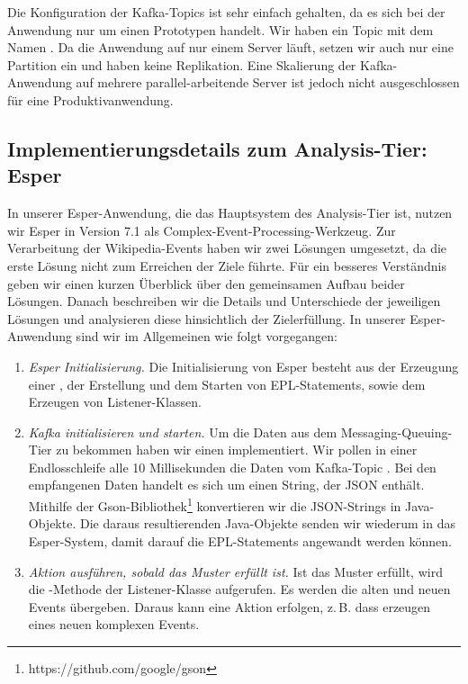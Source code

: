 Die Konfiguration der Kafka-Topics ist sehr einfach gehalten, da es sich bei der Anwendung nur um einen Prototypen handelt.
Wir haben ein Topic mit dem Namen . Da die Anwendung auf nur einem Server läuft, setzen wir auch nur
eine Partition ein und haben keine Replikation. Eine Skalierung der Kafka-Anwendung auf mehrere
parallel-arbeitende Server ist jedoch nicht ausgeschlossen für eine Produktivanwendung.

\subsection{Implementierungsdetails zum Analysis-Tier: Esper}
In unserer Esper-Anwendung, die das Hauptsystem des Analysis-Tier ist, nutzen wir Esper in Version 7.1
als Complex-Event-Processing-Werkzeug.
Zur Verarbeitung der Wikipedia-Events haben wir zwei Lösungen umgesetzt, da die erste Lösung nicht
zum Erreichen der Ziele führte. Für ein besseres Verständnis geben wir einen kurzen Überblick über den gemeinsamen Aufbau beider
Lösungen. Danach beschreiben wir die Details und Unterschiede der jeweiligen Lösungen und analysieren diese hinsichtlich der
Zielerfüllung.
In unserer Esper-Anwendung sind wir im Allgemeinen wie folgt vorgegangen:

\begin{enumerate}
    \item \textit{Esper Initialisierung.} Die Initialisierung von Esper besteht aus der Erzeugung einer ,
    der Erstellung und dem Starten von EPL-Statements, sowie dem Erzeugen von Listener-Klassen.
    \item \textit{Kafka initialisieren und starten.} Um die Daten aus dem Messaging-Queuing-Tier zu bekommen haben wir einen
     implementiert.
    Wir pollen in einer Endlosschleife alle 10 Millisekunden die Daten vom Kafka-Topic . Bei den empfangenen Daten
    handelt es sich um einen String, der JSON enthält. Mithilfe der Gson-Bibliothek\footnote{https://github.com/google/gson}
    konvertieren wir die JSON-Strings in Java-Objekte. Die daraus resultierenden Java-Objekte senden wir wiederum in das
    Esper-System, damit darauf die EPL-Statements angewandt werden können.
    \item \textit{Aktion ausführen, sobald das Muster erfüllt ist.} Ist das Muster erfüllt, wird die -Methode der Listener-Klasse
    aufgerufen. Es werden die alten und neuen Events übergeben. Daraus kann eine Aktion erfolgen, z.\,B. dass erzeugen eines neuen
    komplexen Events.
\end{enumerate}


